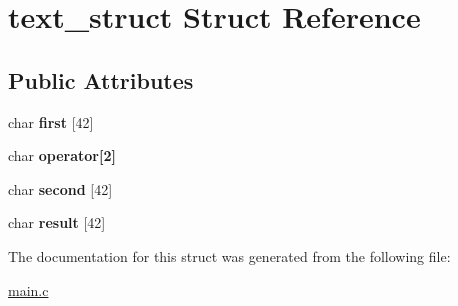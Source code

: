 \hypertarget{structtext__struct}{\section{text\+\_\+struct Struct Reference}
\label{structtext__struct}
}
\subsection*{Public Attributes}
\begin{DoxyCompactItemize}
\item 
\hypertarget{structtext__struct_a79c0a8ab13353292e6602c29d765505e}{char {\bfseries first} \mbox{[}42\mbox{]}}\label{structtext__struct_a79c0a8ab13353292e6602c29d765505e}

\item 
\hypertarget{structtext__struct_ad64daa81f953f4c22b2ad5f40637a532}{char {\bfseries operator\mbox{[}2\mbox{]}}}\label{structtext__struct_ad64daa81f953f4c22b2ad5f40637a532}

\item 
\hypertarget{structtext__struct_a32d0b93577a6e422c8132342fab8ca90}{char {\bfseries second} \mbox{[}42\mbox{]}}\label{structtext__struct_a32d0b93577a6e422c8132342fab8ca90}

\item 
\hypertarget{structtext__struct_a36cb918c6f75b5b9912acf74e6c6bd1e}{char {\bfseries result} \mbox{[}42\mbox{]}}\label{structtext__struct_a36cb918c6f75b5b9912acf74e6c6bd1e}

\end{DoxyCompactItemize}


The documentation for this struct was generated from the following file\+:\begin{DoxyCompactItemize}
\item 
\hyperlink{main_8c}{main.\+c}\end{DoxyCompactItemize}

